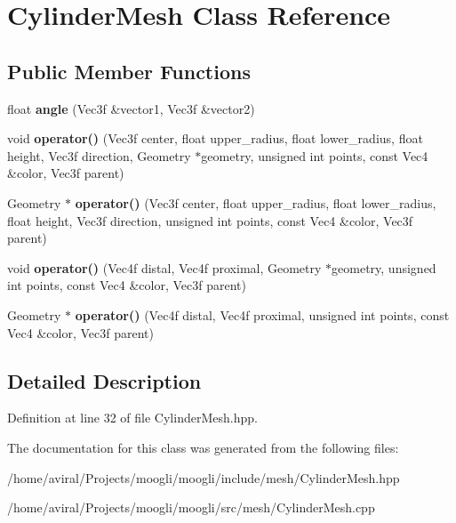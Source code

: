 \hypertarget{classCylinderMesh}{\section{Cylinder\-Mesh Class Reference}
\label{classCylinderMesh}
}
\subsection*{Public Member Functions}
\begin{DoxyCompactItemize}
\item 
\hypertarget{classCylinderMesh_ac4f6f5348573d2e399ff8262df6a7bd7}{float {\bfseries angle} (Vec3f \&vector1, Vec3f \&vector2)}\label{classCylinderMesh_ac4f6f5348573d2e399ff8262df6a7bd7}

\item 
\hypertarget{classCylinderMesh_a644a8fefcc34ad96452e611d008e4956}{void {\bfseries operator()} (Vec3f center, float upper\-\_\-radius, float lower\-\_\-radius, float height, Vec3f direction, Geometry $\ast$geometry, unsigned int points, const Vec4 \&color, Vec3f parent)}\label{classCylinderMesh_a644a8fefcc34ad96452e611d008e4956}

\item 
\hypertarget{classCylinderMesh_a3c0472a3fce11bf20d7565b8695982a8}{Geometry $\ast$ {\bfseries operator()} (Vec3f center, float upper\-\_\-radius, float lower\-\_\-radius, float height, Vec3f direction, unsigned int points, const Vec4 \&color, Vec3f parent)}\label{classCylinderMesh_a3c0472a3fce11bf20d7565b8695982a8}

\item 
\hypertarget{classCylinderMesh_a917e77fce3fc33f27eee094fd7d78491}{void {\bfseries operator()} (Vec4f distal, Vec4f proximal, Geometry $\ast$geometry, unsigned int points, const Vec4 \&color, Vec3f parent)}\label{classCylinderMesh_a917e77fce3fc33f27eee094fd7d78491}

\item 
\hypertarget{classCylinderMesh_a477eb63e8d9bc5a6854759af118c4836}{Geometry $\ast$ {\bfseries operator()} (Vec4f distal, Vec4f proximal, unsigned int points, const Vec4 \&color, Vec3f parent)}\label{classCylinderMesh_a477eb63e8d9bc5a6854759af118c4836}

\end{DoxyCompactItemize}


\subsection{Detailed Description}


Definition at line 32 of file Cylinder\-Mesh.\-hpp.



The documentation for this class was generated from the following files\-:\begin{DoxyCompactItemize}
\item 
/home/aviral/\-Projects/moogli/moogli/include/mesh/Cylinder\-Mesh.\-hpp\item 
/home/aviral/\-Projects/moogli/moogli/src/mesh/Cylinder\-Mesh.\-cpp\end{DoxyCompactItemize}
